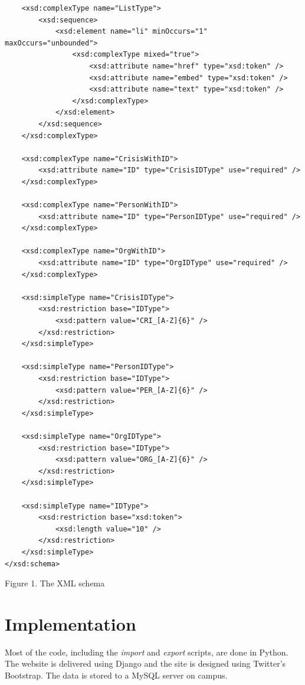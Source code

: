 \documentclass[12pt]{report}
\begin{document}
\begin{lstlisting}
    <xsd:complexType name="ListType">
        <xsd:sequence>
            <xsd:element name="li" minOccurs="1" maxOccurs="unbounded">
                <xsd:complexType mixed="true">
                    <xsd:attribute name="href" type="xsd:token" />
                    <xsd:attribute name="embed" type="xsd:token" />
                    <xsd:attribute name="text" type="xsd:token" />
                </xsd:complexType>
            </xsd:element>
        </xsd:sequence>
    </xsd:complexType>

    <xsd:complexType name="CrisisWithID">
        <xsd:attribute name="ID" type="CrisisIDType" use="required" />
    </xsd:complexType>
    
    <xsd:complexType name="PersonWithID">
        <xsd:attribute name="ID" type="PersonIDType" use="required" />
    </xsd:complexType>
    
    <xsd:complexType name="OrgWithID">
        <xsd:attribute name="ID" type="OrgIDType" use="required" />
    </xsd:complexType>

    <xsd:simpleType name="CrisisIDType">
        <xsd:restriction base="IDType">
            <xsd:pattern value="CRI_[A-Z]{6}" />
        </xsd:restriction>
    </xsd:simpleType>
    
    <xsd:simpleType name="PersonIDType">
        <xsd:restriction base="IDType">
            <xsd:pattern value="PER_[A-Z]{6}" />
        </xsd:restriction>
    </xsd:simpleType>
    
    <xsd:simpleType name="OrgIDType">
        <xsd:restriction base="IDType">
            <xsd:pattern value="ORG_[A-Z]{6}" />
        </xsd:restriction>
    </xsd:simpleType>

    <xsd:simpleType name="IDType">
        <xsd:restriction base="xsd:token">
            <xsd:length value="10" />
        </xsd:restriction>
    </xsd:simpleType>
</xsd:schema>
\end{lstlisting}
\footnotesize
Figure 1. The XML schema %
\normalsize

\newpage
\section*{Implementation}

\hfill \newline
Most of the code, including the \emph{import} and \emph{export} scripts, are done in Python.
The website is delivered using Django and the site is designed using Twitter's Bootstrap.
The data is stored to a MySQL server on campus.
\newline
\end{document}

